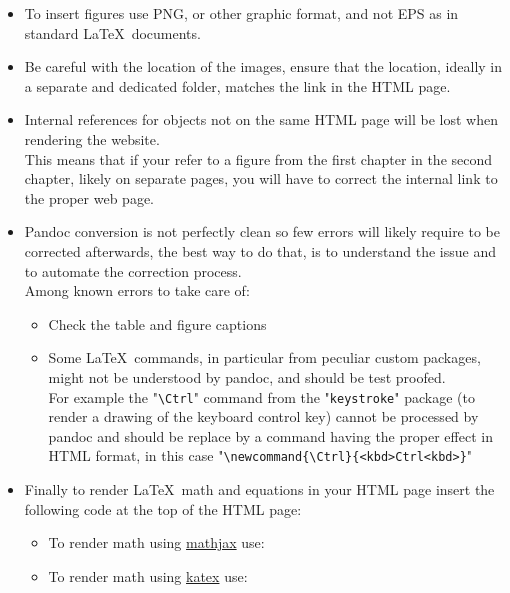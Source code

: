 \begin{itemize}
\item To insert figures use PNG, or other graphic format, and not EPS as in standard \LaTeX\ documents. 
\item Be careful with the location of the images, ensure that the location, ideally in a separate and dedicated folder, 
matches the link in the HTML page. 
\item Internal references for objects not on the same HTML page will be lost when rendering the website. \\
This means that if your refer to a figure from the first chapter in the second chapter, likely on separate pages, 
you will have to correct the internal link to the proper web page. 
\item Pandoc conversion is not perfectly clean so few errors will likely require to be corrected afterwards, the best way 
to do that, is to understand the issue and to automate the correction process. \\
Among known errors to take care of:
\begin{itemize}
\item Check the table and figure captions
\item Some \LaTeX\ commands, in particular from peculiar custom packages, might not be understood by pandoc, and should be test proofed. \\[0.25cm]
For example the "\texttt{\textbackslash{Ctrl}}" command from the "\texttt{keystroke}" package (to render a drawing of the keyboard control key) 
cannot be processed by pandoc and should be replace by a command having the proper effect in HTML format, 
in this case "\texttt{\textbackslash{newcommand}\{\textbackslash{Ctrl}\}\{<kbd>Ctrl<\/kbd>\}}"
\end{itemize}
\item Finally to render \LaTeX\ math and equations in your HTML page insert the following code at the top of the HTML page:
\begin{itemize}
\item To render math using \href{https://www.mathjax.org/}{mathjax} use:
{}
\item To render math using \href{https://katex.org/}{katex} use:

\end{itemize}
\end{itemize}
